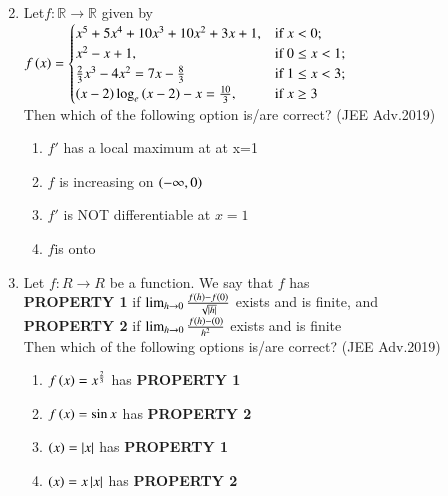 \documentclass[journal,12pt,twocolumn]{IEEEtran}
\theoremstyle{remark}
\begin{document}
\begin{enumerate}[start=26]
\begin{enumerate}
\begin{multicols}{2}
\end{multicols}
\end{enumerate}
\item %
Let$f:\mathbb{R} \to \mathbb{R}$ given by \\
$f\left(x\right) = 
\begin{cases} 
x^5+5x^4+10x^3+10x^2+3x+1, & \text{if } x < 0; \\
x^2-x+1, & \text{if } 0 \leq x <1; \\
\frac{2}{3}x^3-4x^2=7x-\frac{8}{3} & \text{if } 1 \leq x <3; \\
\left(x-2\right)\log_e\left(x-2\right)-x=\frac{10}{3},& \text{if } x \geq 3
\end{cases}$ \\
Then which of the following option is/are correct?
\hfill  (JEE Adv.2019) \\
\begin{enumerate}
\item $f'$ has a local maximum at at x=1 
\item $f$ is increasing on $\left(-\infty , 0\right)$
\item $f'$ is NOT differentiable at $x=1$
\item $f$is onto 
\end{enumerate} 
 \item %
 Let $f:R \to R$ be a function. We say that $f$ has \\
\textbf{PROPERTY 1} if $\lim_{h\to0}\frac{f\left(h\right)-f\left(0\right)}{\sqrt{\left\vert h\right\vert}}$ exists and is finite, and \\
\textbf{PROPERTY 2} if $\lim_{h\to0}\frac{f\left(h\right)-\left(0\right)}{h^2}$ exists and is finite \\
Then which of the following options is/are correct? 
\hfill (JEE Adv.2019) \\
\begin{enumerate}
\item $f\left(x\right)=x^{\frac{2}{3}}$ has \textbf{PROPERTY 1} 
\item $f\left(x\right)=\sin{x}$ has \textbf{PROPERTY 2} 
\item $\left(x\right)=\left\vert x\right\vert$ has \textbf{PROPERTY 1} 
\item $\left(x\right)=x\left\vert x\right\vert$ has \textbf{PROPERTY 2} 
\end{enumerate}
\end{enumerate}
\end{document}

